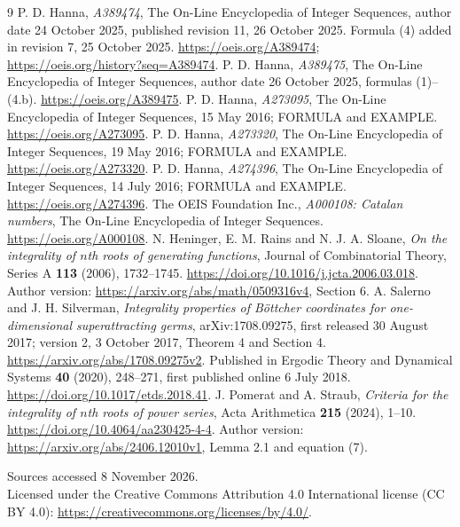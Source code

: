 \documentclass[11pt]{article}
\begin{document}
\begin{thebibliography}{9}
 P. D. Hanna, \emph{A389474}, The On-Line Encyclopedia
of Integer Sequences, author date 24 October 2025, published revision 11,
26 October 2025. Formula (4) added in revision 7, 25 October 2025.
\url{https://oeis.org/A389474};
\url{https://oeis.org/history?seq=A389474}.
 P. D. Hanna, \emph{A389475}, The On-Line Encyclopedia
of Integer Sequences, author date 26 October 2025, formulas (1)--(4.b).
\url{https://oeis.org/A389475}.
 P. D. Hanna, \emph{A273095}, The On-Line Encyclopedia
of Integer Sequences, 15 May 2016; FORMULA and EXAMPLE.
\url{https://oeis.org/A273095}.
 P. D. Hanna, \emph{A273320}, The On-Line Encyclopedia
of Integer Sequences, 19 May 2016; FORMULA and EXAMPLE.
\url{https://oeis.org/A273320}.
 P. D. Hanna, \emph{A274396}, The On-Line Encyclopedia
of Integer Sequences, 14 July 2016; FORMULA and EXAMPLE.
\url{https://oeis.org/A274396}.
 The OEIS Foundation Inc., \emph{A000108: Catalan
numbers}, The On-Line Encyclopedia of Integer Sequences.
\url{https://oeis.org/A000108}.
 N. Heninger, E. M. Rains and N. J. A. Sloane,
\emph{On the integrality of $n$th roots of generating functions},
Journal of Combinatorial Theory, Series A \textbf{113} (2006), 1732--1745.
\url{https://doi.org/10.1016/j.jcta.2006.03.018}.
Author version: \url{https://arxiv.org/abs/math/0509316v4}, Section 6.
 A. Salerno and J. H. Silverman,
\emph{Integrality properties of B\"ottcher coordinates for
one-dimensional superattracting germs}, arXiv:1708.09275,
first released 30 August 2017; version 2, 3 October 2017,
Theorem 4 and Section 4.
\url{https://arxiv.org/abs/1708.09275v2}.
Published in Ergodic Theory and Dynamical Systems \textbf{40} (2020),
248--271, first published online 6 July 2018.
\url{https://doi.org/10.1017/etds.2018.41}.
 J. Pomerat and A. Straub,
\emph{Criteria for the integrality of $n$th roots of power series},
Acta Arithmetica \textbf{215} (2024), 1--10.
\url{https://doi.org/10.4064/aa230425-4-4}.
Author version: \url{https://arxiv.org/abs/2406.12010v1},
Lemma 2.1 and equation (7).
\end{thebibliography}
\noindent Sources accessed 8 November 2026.\\
\noindent Licensed under the Creative Commons Attribution 4.0
International license (CC BY 4.0):
\url{https://creativecommons.org/licenses/by/4.0/}.
\end{document}
